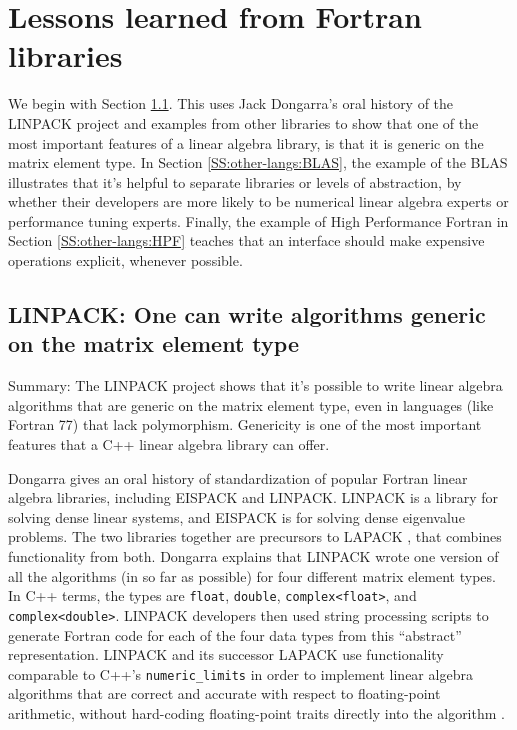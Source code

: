 \section{Lessons learned from Fortran libraries}
\label{S:other-langs}

We begin with Section \ref{SS:other-langs:LINPACK}.  This uses Jack
Dongarra's oral history of the LINPACK project and examples from other
libraries to show that one of the most important features of a linear
algebra library, is that it is generic on the matrix element type.  In
Section \ref{SS:other-langs:BLAS}, the example of the BLAS illustrates
that it's helpful to separate libraries or levels of abstraction, by
whether their developers are more likely to be numerical linear
algebra experts or performance tuning experts.  Finally, the example
of High Performance Fortran in Section \ref{SS:other-langs:HPF}
teaches that an interface should make expensive operations explicit,
whenever possible.


\subsection{LINPACK: One can write algorithms
  generic on the matrix element type}
\label{SS:other-langs:LINPACK}

Summary: The LINPACK project shows that it's possible to write linear
algebra algorithms that are generic on the matrix element type, even
in languages (like Fortran 77) that lack polymorphism.  Genericity is
one of the most important features that a C++ linear algebra library
can offer.

Dongarra gives an oral history \cite{dongarra2005history} of
standardization of popular Fortran linear algebra libraries, including
EISPACK and LINPACK.  LINPACK \cite{dongarra1979linpack} is a library
for solving dense linear systems, and EISPACK \cite{garbow1974eispack}
is for solving dense eigenvalue problems.  The two libraries together
are precursors to LAPACK \cite{anderson1990lapack}, that combines
functionality from both.  Dongarra explains that LINPACK wrote one
version of all the algorithms (in so far as possible) for four
different matrix element types.  In C++ terms, the types are
\texttt{float}, \texttt{double}, \texttt{complex<float>}, and
\texttt{complex<double>}.  LINPACK developers then used string
processing scripts to generate Fortran code for each of the four data
types from this ``abstract'' representation.  LINPACK and its
successor LAPACK use functionality comparable to C++'s
\texttt{numeric\_limits} in order to implement linear algebra
algorithms that are correct and accurate with respect to
floating-point arithmetic, without hard-coding floating-point traits
directly into the algorithm \cite{P1370R0}.

